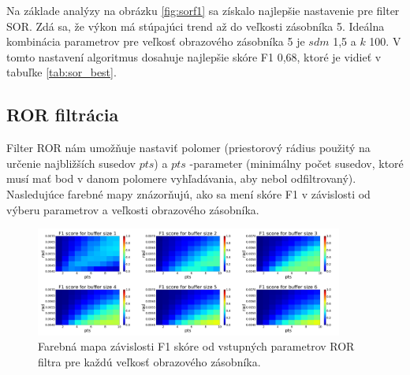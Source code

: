 Na základe analýzy na obrázku \ref{fig:sorf1} sa získalo najlepšie nastavenie pre filter SOR. Zdá sa, že výkon má stúpajúci trend až do veľkosti zásobníka 5. Ideálna kombinácia parametrov pre veľkosť obrazového zásobníka 5 je $sdm$ 1,5 a $k$ 100. V tomto nastavení algoritmus dosahuje najlepšie skóre F1 0,68, ktoré je vidieť v tabuľke \ref{tab:sor_best}.

\subsection{ROR filtrácia}
\label{sec:ror}
Filter ROR nám umožňuje nastaviť polomer (priestorový rádius použitý na určenie najbližších susedov $pts$) a  $pts$ -parameter (minimálny počet susedov, ktoré musí mať bod v danom polomere vyhľadávania, aby nebol  odfiltrovaný). Nasledujúce farebné mapy znázorňujú, ako sa mení skóre F1 v závislosti od výberu parametrov a veľkosti obrazového zásobníka.

\begin{figure}[H]
	\centering
	\includegraphics[width=0.9\textwidth]{figures/ror_f1.png}
	\caption{Farebná mapa závislosti F1 skóre od vstupných parametrov ROR filtra pre každú veľkosť obrazového zásobníka.}
	\label{fig:rorf1}
\end{figure}

